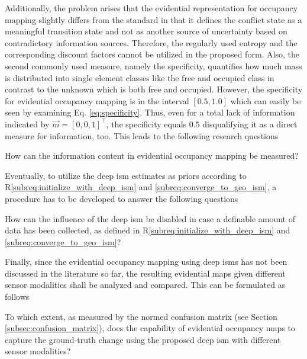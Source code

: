 Additionally, the problem arises that the evidential representation for occupancy mapping slightly differs from the standard in that it defines the conflict state as a meaningful transition state and not as another source of uncertainty based on contradictory information sources. Therefore, the regularly used entropy and the corresponding discount factors cannot be utilized in the proposed form. Also, the second commonly used measure, namely the specificity, quantifies how much mass is distributed into single element classes like the free and occupied class in contrast to the unknown which is both free and occupied. However, the specificity for evidential occupancy mapping is in the interval $[0.5,1.0]$ which can easily be seen by examining Eq. \ref{eq:specificity}. Thus, even for a total lack of information indicated by $\vec{m} = [0,0,1]^\top$, the specificity equals $0.5$ disqualifying it as a direct measure for information, too. This leads to the following research questions 
\begin{requ} \label{requ:how_to_meas_info}
	How can the information content in evidential occupancy mapping be measured?
\end{requ}
Eventually, to utilize the deep \gls{ism} estimates as priors according to R\ref{subreq:initialize_with_deep_ism} and \ref{subreq:converge_to_geo_ism}, a procedure has to be developed to answer the following questions
\begin{requ} \label{requ:disable_deep_ism_influence}
	How can the influence of the deep \gls{ism} be disabled in case a definable amount of data has been collected, as defined in R\ref{subreq:initialize_with_deep_ism} and \ref{subreq:converge_to_geo_ism}?
\end{requ}
Finally, since the evidential occupancy mapping using deep \gls{ism}s has not been discussed in the literature so far, the resulting evidential maps given different sensor modalities shall be analyzed and compared. This can be formulated as follows
\\
\begin{requ} \label{requ:comp_deep_occ_maps}
	To which extent, as measured by the normed confusion matrix (see Section \ref{subsec:confusion_matrix}), does the capability of evidential occupancy maps to capture the ground-truth change using the proposed deep \gls{ism} with different sensor modalities?
\end{requ}
%
